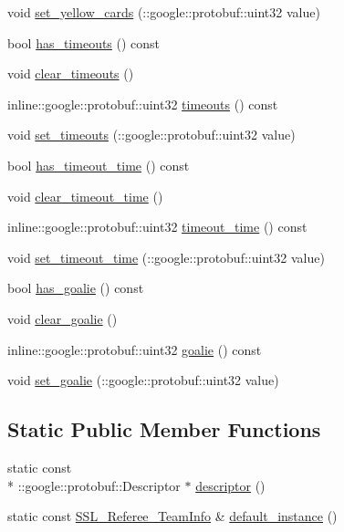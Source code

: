 \begin{DoxyCompactItemize}
void \hyperlink{class_s_s_l___referee___team_info_af4ffda72e39fb6280df3cf9a723a6965}{set\-\_\-yellow\-\_\-cards} (\-::google\-::protobuf\-::uint32 value)
\item 
bool \hyperlink{class_s_s_l___referee___team_info_aab4cb83fc16edcf59d0bea7990694150}{has\-\_\-timeouts} () const 
\item 
void \hyperlink{class_s_s_l___referee___team_info_a7d924edbae0801daec52722b3ac22e77}{clear\-\_\-timeouts} ()
\item 
inline\-::google\-::protobuf\-::uint32 \hyperlink{class_s_s_l___referee___team_info_acbcfe1bb5bb65ecae3c153940118480c}{timeouts} () const 
\item 
void \hyperlink{class_s_s_l___referee___team_info_ad6aea455243828e11a9a2e4189a70ce6}{set\-\_\-timeouts} (\-::google\-::protobuf\-::uint32 value)
\item 
bool \hyperlink{class_s_s_l___referee___team_info_a129fa1452c116f40ae9668d4351f3fab}{has\-\_\-timeout\-\_\-time} () const 
\item 
void \hyperlink{class_s_s_l___referee___team_info_ad19c0a78648f224dcf923391d13a85ec}{clear\-\_\-timeout\-\_\-time} ()
\item 
inline\-::google\-::protobuf\-::uint32 \hyperlink{class_s_s_l___referee___team_info_a8a8b985b7b37443375a9a4fcc27caf79}{timeout\-\_\-time} () const 
\item 
void \hyperlink{class_s_s_l___referee___team_info_a6d8e77be4d852ede4344666d836f9c71}{set\-\_\-timeout\-\_\-time} (\-::google\-::protobuf\-::uint32 value)
\item 
bool \hyperlink{class_s_s_l___referee___team_info_a6acb19d0d83247627636ad1b5b5b53f3}{has\-\_\-goalie} () const 
\item 
void \hyperlink{class_s_s_l___referee___team_info_ae75d1e2f1b6d5e660658b96ca9656226}{clear\-\_\-goalie} ()
\item 
inline\-::google\-::protobuf\-::uint32 \hyperlink{class_s_s_l___referee___team_info_a0bb726350f9eb59c0accada0471667c0}{goalie} () const 
\item 
void \hyperlink{class_s_s_l___referee___team_info_a653624ad06239cedc004d3f5d53a199f}{set\-\_\-goalie} (\-::google\-::protobuf\-::uint32 value)
\end{DoxyCompactItemize}
\subsection*{Static Public Member Functions}
\begin{DoxyCompactItemize}
\item 
static const \\*
\-::google\-::protobuf\-::\-Descriptor $\ast$ \hyperlink{class_s_s_l___referee___team_info_a0c174c3507cc614f240cd6f349442f40}{descriptor} ()
\item 
static const \hyperlink{class_s_s_l___referee___team_info}{S\-S\-L\-\_\-\-Referee\-\_\-\-Team\-Info} \& \hyperlink{class_s_s_l___referee___team_info_a7e573d64c93a1530b457b3e836a68f1d}{default\-\_\-instance} ()
\end{DoxyCompactItemize}
